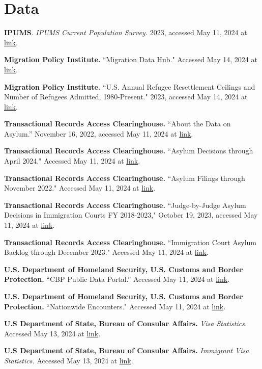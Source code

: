 \documentclass{article}
\begin{document}
\section{Data}

\begin{hangparas}{.25in}{1}

\textbf{IPUMS}. \textit{IPUMS Current Population Survey.} 2023, accessed May 11, 2024 at \href{https://doi.org/10.18128/D030.V11.0}{link}.

\textbf{Migration Policy Institute.} ``Migration Data Hub." Accessed May 14, 2024 at \href{https://www.migrationpolicy.org/programs/migration-data-hub}{link}.

\textbf{Migration Policy Institute.} ``U.S. Annual Refugee Resettlement Ceilings and Number of Refugees Admitted, 1980-Present." 2023, accessed May 14, 2024 at \href{https://www.migrationpolicy.org/programs/data-hub/charts/us-refugee-resettlement}{link}.

\textbf{Transactional Records Access Clearinghouse.} “About the Data on Asylum.” November 16, 2022, accessed May 11, 2024 at \href{https://tinyurl.com/yn9s2vbx}{link}. 

\textbf{Transactional Records Access Clearinghouse.} ``Asylum Decisions through April 2024." Accessed May 11, 2024 at \href{https://tinyurl.com/5n8pe5rn}{link}. 

\textbf{Transactional Records Access Clearinghouse.} ``Asylum Filings through November 2022." Accessed May 11, 2024 at \href{https://tinyurl.com/3dkay4yr}{link}. 

\textbf{Transactional Records Access Clearinghouse.} ``Judge-by-Judge Asylum Decisions in Immigration Courts FY 2018-2023," October 19, 2023, accessed May 11, 2024 at \href{https://tinyurl.com/3zanp3xj}{link}. 

\textbf{Transactional Records Access Clearinghouse.} ``Immigration Court Asylum Backlog through December 2023." Accessed May 11, 2024 at \href{https://tinyurl.com/3pw26wcj}{link}. 

\textbf{U.S. Department of Homeland Security, U.S. Customs and Border Protection.} “CBP Public Data Portal.” Accessed May 11, 2024 at \href{https://www.cbp.gov/newsroom/stats/cbp-public-data-portal}{link}. 

\textbf{U.S. Department of Homeland Security, U.S. Customs and Border Protection.} ``Nationwide Encounters." Accessed May 11, 2024 at \href{https://www.cbp.gov/document/stats/nationwide-encounters}{link}. 

\textbf{U.S Department of State, Bureau of Consular Affairs.} \textit{Visa Statistics.} Accessed May 13, 2024 at \href{https://travel.state.gov/content/travel/en/legal/visa-law0/visa-statistics.html}{link}. 

\textbf{U.S Department of State, Bureau of Consular Affairs.} \textit{Immigrant Visa Statistics.} Accessed May 13, 2024 at \href{https://travel.state.gov/content/travel/en/legal/visa-law0/visa-statistics/immigrant-visa-statistics.html}{link}. 

\end{hangparas}
\end{document}
